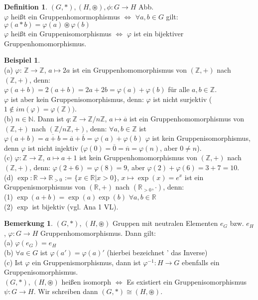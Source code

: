 \documentclass[10pt,a4paper,numbers=endperiod]{scrartcl}
\theoremstyle{definition}
\newtheorem{defi}[satz]{Definition}
\newtheorem{bem}[satz]{Bemerkung}
\newtheorem{bsp}[satz]{Beispiel}
\begin{document}
\begin{defi}
	$(G,*), (H, \circledast), \phi: G\rightarrow H$ Abb.\\
	$\varphi$ heißt ein Gruppenhomormophismus $\Leftrightarrow$ $\forall a,b \in G$ gilt: $\varphi(a*b) = \varphi(a) \circledast \varphi(b)$\\
	$\varphi$ heißt ein Gruppenisomorphismus $\Leftrightarrow$ $\varphi$ ist ein bijektiver Gruppenhomomorphismus.
\end{defi}
\newpage
\begin{bsp}
	$ $\\
	(a) $\varphi$: $\mathbb{Z} \rightarrow \mathbb{Z}$, $a\mapsto2a$ ist ein Gruppenhomomorphismus von $(\mathbb{Z}, +)$ nach $(\mathbb{Z},+)$, denn:\\ $\varphi(a+b)=2(a+b)=2a+2b=\varphi(a)+\varphi(b)$ für alle $a,b \in \mathbb{Z}$.\\ $\varphi$ ist aber kein Gruppenisomorphismus, denn: $\varphi$ ist nicht surjektiv ($1 \notin im(\varphi)= \varphi(\mathbb{Z}))$.\\
	
	(b) $n \in \mathbb{N}$. Dann ist $q:\mathbb{Z} \rightarrow \mathbb{Z}/n\mathbb{Z}$, $a\mapsto \overline{a}$ ist ein Gruppenhomomorphismus von $(\mathbb{Z},+)$ nach $(\mathbb{Z}/n\mathbb{Z},+)$, denn: $\forall a,b \in \mathbb{Z}$ ist $\varphi(a+b)=\overline{a+b}=\overline{a}+\overline{b}=\varphi(a)+\varphi(b)$ $\varphi$ ist kein Gruppenisomorphismus, denn $\varphi$ ist nicht injektiv ($\varphi(0)=\overline{0}=\overline{n}=\varphi(n)$, aber $0 \neq n$).\\
	
	(c) $\varphi:\mathbb{Z} \rightarrow \mathbb{Z}$, $a\mapsto a+1$ ist kein Gruppenhomomorphismus von $(\mathbb{Z},+)$ nach $(\mathbb{Z},+)$, denn: $\varphi(2+6)=\varphi(8)=9$, aber $\varphi(2)+\varphi(6)=3+7=10$.\\
	
	(d) $\exp:\mathbb{R} \rightarrow \mathbb{R}_{>0}$ := $\{x \in \mathbb{R}|x>0\}$, $x \mapsto \exp(x)= e^x$ ist ein Gruppenismorphismus von $(\mathbb{R},+)$ nach $(\mathbb{R}_{>0}, \cdot)$, denn:\\
	(1) $\exp(a+b)=\exp(a)\exp(b)$ $\forall a,b \in \mathbb{R}$\\
	(2) $\exp$ ist bijektiv (vgl. Ana 1 VL).
\end{bsp}

\begin{bem}
	$(G,*)$, $(H, \circledast)$ Gruppen mit neutralen Elementen $e_G$ bzw. $e_H$, $\varphi:G \rightarrow H$ Gruppenhomomorphismus. Dann gilt:\\
	(a) $\varphi(e_G)=e_H$\\
	(b) $\forall a \in G$ ist $\varphi(a') = \varphi(a)'$ (hierbei bezeichnet ' das Inverse)\\
	(c) Ist $\varphi$ ein Gruppenismorphismus, dann ist $\varphi^{-1}:H \rightarrow G$ ebenfalls ein Gruppenisomorphismus.\\
	$(G,*)$, $(H, \circledast)$ heißen isomorph $\Leftrightarrow$ Es existiert ein Gruppenisomorphismus $\psi: G \rightarrow H$. Wir schreiben dann $(G,*) \cong (H,\circledast)$.
\end{bem}
\end{document}
